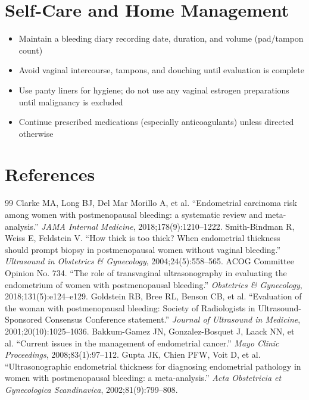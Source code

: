 \section*{Self-Care and Home Management}
\begin{itemize}
  \item Maintain a bleeding diary recording date, duration, and volume (pad/tampon count)
  \item Avoid vaginal intercourse, tampons, and douching until evaluation is complete
  \item Use panty liners for hygiene; do not use any vaginal estrogen preparations until malignancy is excluded
  \item Continue prescribed medications (especially anticoagulants) unless directed otherwise
\end{itemize}

\section*{References}
\begin{thebibliography}{99}
 Clarke MA, Long BJ, Del Mar Morillo A, et al. ``Endometrial carcinoma risk among women with postmenopausal bleeding: a systematic review and meta-analysis.'' \textit{JAMA Internal Medicine}, 2018;178(9):1210--1222.
 Smith-Bindman R, Weiss E, Feldstein V. ``How thick is too thick? When endometrial thickness should prompt biopsy in postmenopausal women without vaginal bleeding.'' \textit{Ultrasound in Obstetrics \& Gynecology}, 2004;24(5):558--565.
 ACOG Committee Opinion No. 734. ``The role of transvaginal ultrasonography in evaluating the endometrium of women with postmenopausal bleeding.'' \textit{Obstetrics \& Gynecology}, 2018;131(5):e124--e129.
 Goldstein RB, Bree RL, Benson CB, et al. ``Evaluation of the woman with postmenopausal bleeding: Society of Radiologists in Ultrasound-Sponsored Consensus Conference statement.'' \textit{Journal of Ultrasound in Medicine}, 2001;20(10):1025--1036.
 Bakkum-Gamez JN, Gonzalez-Bosquet J, Laack NN, et al. ``Current issues in the management of endometrial cancer.'' \textit{Mayo Clinic Proceedings}, 2008;83(1):97--112.
 Gupta JK, Chien PFW, Voit D, et al. ``Ultrasonographic endometrial thickness for diagnosing endometrial pathology in women with postmenopausal bleeding: a meta-analysis.'' \textit{Acta Obstetricia et Gynecologica Scandinavica}, 2002;81(9):799--808.

\end{thebibliography}
